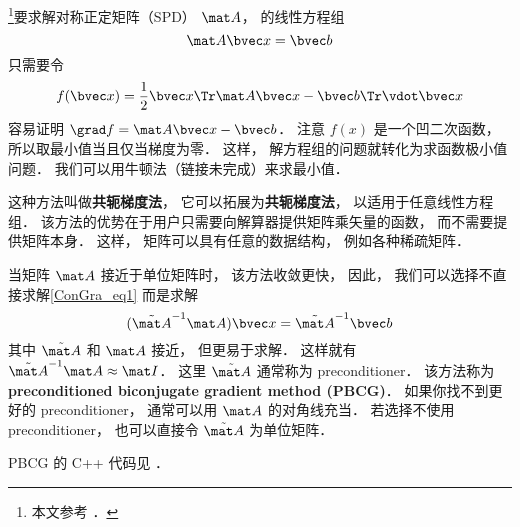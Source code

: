 

\footnote{本文参考 \cite{NR3}．}要求解对称正定矩阵（SPD） $\mat A$， 的线性方程组
\begin{equation}\label{ConGra_eq1}
\mat A \bvec x = \bvec b
\end{equation}
只需要令
\begin{equation}
f(\bvec x) = \frac{1}{2}\bvec x\Tr \mat A\bvec x - \bvec b\Tr \vdot \bvec x
\end{equation}
容易证明 $\grad f = \mat A \bvec x - \bvec b$． 注意 $f(x)$ 是一个凹二次函数， 所以取最小值当且仅当梯度为零． 这样， 解方程组的问题就转化为求函数极小值问题． 我们可以用牛顿法（链接未完成）来求最小值．

这种方法叫做\textbf{共轭梯度法}， 它可以拓展为\textbf{共轭梯度法}， 以适用于任意线性方程组． 该方法的优势在于用户只需要向解算器提供矩阵乘矢量的函数， 而不需要提供矩阵本身． 这样， 矩阵可以具有任意的数据结构， 例如各种稀疏矩阵．

当矩阵 $\mat A$ 接近于单位矩阵时， 该方法收敛更快， 因此， 我们可以选择不直接求解\autoref{ConGra_eq1} 而是求解
\begin{equation}
(\tilde {\mat A}^{-1}\mat A) \bvec x = \tilde {\mat A}^{-1}\bvec b
\end{equation}
其中 $\tilde {\mat A}$ 和 $\mat A$ 接近， 但更易于求解． 这样就有 $\tilde {\mat A}^{-1}\mat A \approx \mat I$． 这里 $\tilde {\mat A}$ 通常称为 preconditioner． 该方法称为 \textbf{preconditioned biconjugate gradient method (PBCG)}． 如果你找不到更好的 preconditioner， 通常可以用 $\mat A$ 的对角线充当． 若选择不使用 preconditioner， 也可以直接令 $\tilde {\mat A}$ 为单位矩阵．

PBCG 的 C++ 代码见 \cite{NR3}．
